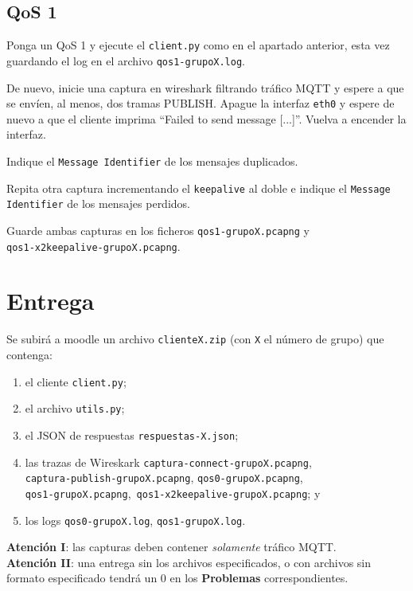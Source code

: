 \documentclass{upmassignment}
\begin{document}
\subsection*{QoS 1}
\noindent
Ponga un QoS 1 y ejecute el \texttt{client.py}
como en el apartado anterior, esta vez
guardando el log en el archivo
\texttt{qos1-grupoX.log}.

De nuevo, inicie una captura en wireshark
filtrando tráfico MQTT y espere a que
se envíen, al menos, dos tramas PUBLISH.
Apague la interfaz \texttt{eth0}
y espere de nuevo a que el cliente
imprima ``Failed to send message [...]''.
Vuelva a encender la interfaz.





\begin{problemlist}
    \setcounter{enumi}{6}
    \pbitem Indique el
        \texttt{Message Identifier}
        de los mensajes duplicados.


    \pbitem Repita otra captura
        incrementando el \texttt{keepalive}
        al doble e indique el
        \texttt{Message Identifier}
        de los mensajes perdidos.

\end{problemlist}
Guarde ambas capturas
en los ficheros
\texttt{qos1-grupoX.pcapng} y\\
\texttt{qos1-x2keepalive-grupoX.pcapng}.




\section*{Entrega}
\noindent Se subirá a moodle un archivo
\texttt{clienteX.zip}
(con \texttt{X} el número de grupo)
que contenga:
\begin{enumerate}
    \item el cliente \texttt{client.py};
    \item el archivo \texttt{utils.py};
    \item el JSON de respuestas \texttt{respuestas-X.json};
    \item las trazas de Wireskark
        \texttt{captura-connect-grupoX.pcapng},\\
        \texttt{captura-publish-grupoX.pcapng},
        \texttt{qos0-grupoX.pcapng},\\
        \texttt{qos1-grupoX.pcapng},\
        \texttt{qos1-x2keepalive-grupoX.pcapng}; y
    \item los logs
        \texttt{qos0-grupoX.log},
        \texttt{qos1-grupoX.log}.
\end{enumerate}

\begin{tcolorbox}
    \textbf{Atención I}: las capturas
    deben contener
    \emph{solamente} tráfico MQTT.\\
    \textbf{Atención II}: una entrega
    sin los archivos especificados,
    o con archivos sin formato especificado
    tendrá un 0 en los \textbf{Problemas}
    correspondientes.
\end{tcolorbox}
\end{document}
